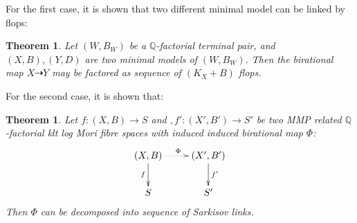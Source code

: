 \documentclass[11pt]{amsart}
\numberwithin{equation}{section}
\newtheorem{thm}[defn]{Theorem}
\begin{document}
For the first case, it is shown that two different minimal model can be linked by flops:
\begin{thm}
  \cite[Theorem 1]{kawamataFlopsConnectMinimal2008} Let $(W,B_W)$ be a $\mathbb{Q}$-factorial terminal pair, and $(X,B),(Y,D)$ are two minimal models of $(W,B_W)$. Then the birational map $X\dashrightarrow Y$ may be factored as sequence of $(K_X+B)$ flops. 
\end{thm}
For the second case, it is shown that:

\begin{thm}\label{main}
  Let $ f:(X,B)\to S$ and $,f':(X',B')\to S' $ be two MMP related $ \mathbb{Q} $-factorial klt log Mori fibre spaces with induced induced  birational map $\Phi$:
  \[ \xymatrix{
    (X,B)\ar[d]_f\ar@{.>}[r]^\Phi&(X',B')\ar[d]^{f'}\\
    S&S'} \]
  Then $ \Phi  $ can be decomposed into sequence of Sarkisov links.
  \end{thm}
\end{document}
